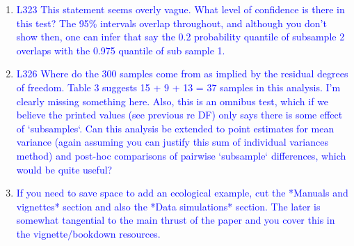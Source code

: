 \documentclass[12pt,letterpaper]{article}
\begin{document}
\begin{enumerate}
\item{\textcolor{blue}{L323 This statement seems overly vague. What level of confidence is there in this test? The 95\% intervals overlap throughout, and although you don't show then, one can infer that say the 0.2 probability quantile of subsample 2 overlaps with the 0.975 quantile of sub sample 1.}}


\item{\textcolor{blue}{L326 Where do the 300 samples come from as implied by the residual degrees of freedom. Table 3 suggests 15 + 9 + 13 = 37 samples in this analysis. I'm clearly missing something here. Also, this is an omnibus test, which if we believe the printed values (see previous re DF) only says there is some effect of `subsamples`. Can this analysis be extended to point estimates for mean variance (again assuming you can justify this sum of individual variances method) and post-hoc comparisons of pairwise `subsample` differences, which would be quite useful?}}


\item{\textcolor{blue}{If you need to save space to add an ecological example, cut the *Manuals and vignettes* section and also the *Data simulations* section. The later is somewhat tangential to the main thrust of the paper and you cover this in the vignette/bookdown resources.}}
\label{remove_simulations}


\end{enumerate}
\end{document}
